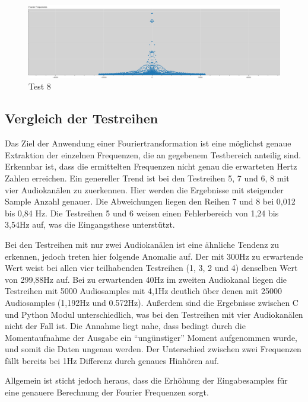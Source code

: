 \begin{figure}[h!]
	\centering      
	\includegraphics[scale=0.34]{results/test8.png}
	\caption{Test 8}
	\label{fig:test8}
\end{figure}

\newpage

\subsection{Vergleich der Testreihen}

Das Ziel der Anwendung einer Fouriertransformation ist eine möglichst genaue Extraktion der einzelnen Frequenzen, die an gegebenem Testbereich anteilig sind.
Erkennbar ist, dass die ermittelten Frequenzen nicht genau die erwarteten Hertz Zahlen erreichen. Ein genereller Trend ist bei den Testreihen 5, 7 und 6, 8 mit vier Audiokanälen zu zuerkennen. Hier werden die Ergebnisse mit steigender Sample Anzahl genauer. Die Abweichungen liegen den Reihen 7 und 8 bei 0,012 bis 0,84 Hz. Die Testreihen 5 und 6 weisen einen Fehlerbereich von 1,24 bis 3,54Hz auf, was die Eingangsthese unterstützt.

Bei den Testreihen mit nur zwei Audiokanälen ist eine ähnliche Tendenz zu erkennen, jedoch treten hier folgende Anomalie auf. Der mit 300Hz zu erwartende Wert weist bei allen vier teilhabenden Testreihen (1, 3, 2 und 4) denselben Wert von 299,88Hz auf. Bei zu erwartenden 40Hz im zweiten Audiokanal liegen die Testreihen mit 5000 Audiosamples mit 4,1Hz deutlich über denen mit 25000 Audiosamples (1,192Hz und 0.572Hz). Außerdem sind die Ergebnisse zwischen C und Python Modul unterschiedlich, was bei den Testreihen mit vier Audiokanälen nicht der Fall ist. Die Annahme liegt nahe, dass bedingt durch die Momentaufnahme der Ausgabe ein \enquote{ungünstiger} Moment aufgenommen wurde, und somit die Daten ungenau werden. Der Unterschied zwischen zwei Frequenzen fällt bereits bei 1Hz Differenz durch genaues Hinhören auf.

Allgemein ist sticht jedoch heraus, dass die Erhöhung der Eingabesamples für eine genauere Berechnung der Fourier Frequenzen sorgt. 





